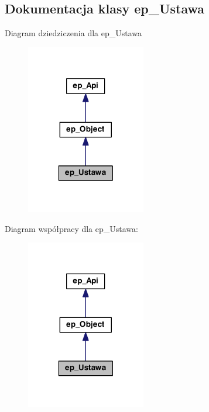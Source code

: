 \hypertarget{classep___ustawa}{\subsection{Dokumentacja klasy ep\-\_\-\-Ustawa}
\label{classep___ustawa}
}


Diagram dziedziczenia dla ep\-\_\-\-Ustawa\nopagebreak
\begin{figure}[H]
\begin{center}
\leavevmode
\includegraphics[width=148pt]{classep___ustawa__inherit__graph}
\end{center}
\end{figure}


Diagram współpracy dla ep\-\_\-\-Ustawa\-:\nopagebreak
\begin{figure}[H]
\begin{center}
\leavevmode
\includegraphics[width=148pt]{classep___ustawa__coll__graph}
\end{center}
\end{figure}
